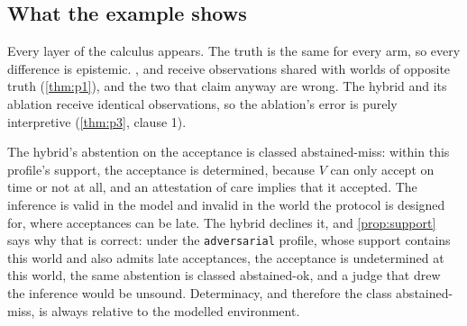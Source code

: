 \subsection{What the example shows}

Every layer of the calculus appears. The truth is the same for every arm, so every difference is epistemic. ,  and  receive observations shared with worlds of opposite truth (\cref{thm:p1}), and the two that claim anyway are wrong. The hybrid and its ablation receive identical observations, so the ablation's error is purely interpretive (\cref{thm:p3}, clause 1).

The hybrid's abstention on the acceptance is classed abstained-miss: within this profile's support, the acceptance is determined, because $V$ can only accept on time or not at all, and an attestation of care implies that it accepted. The inference is valid in the model and invalid in the world the protocol is designed for, where acceptances can be late. The hybrid declines it, and \cref{prop:support} says why that is correct: under the \texttt{adversarial} profile, whose support contains this world and also admits late acceptances, the acceptance is undetermined at this world, the same abstention is classed abstained-ok, and a judge that drew the inference would be unsound. Determinacy, and therefore the class abstained-miss, is always relative to the modelled environment.
